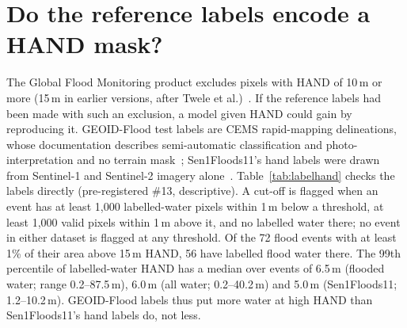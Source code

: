 \documentclass[journal,onecolumn]{IEEEtran}
\begin{document}
\section*{Do the reference labels encode a HAND mask?}

The Global Flood Monitoring product excludes pixels with HAND of 10\,m or more (15\,m in earlier versions,
after Twele et al.)~\cite{gfm2025pdd,twele2016sentinel1}. If the reference labels had been made with such an
exclusion, a model given HAND could gain by reproducing it. GEOID-Flood test labels are CEMS rapid-mapping
delineations, whose documentation describes semi-automatic classification and photo-interpretation and no
terrain mask~\cite{joubertboitat2020cemsrm}; Sen1Floods11's hand labels were drawn from Sentinel-1 and
Sentinel-2 imagery alone~\cite{bonafilia2020sen1floods11}. Table~\ref{tab:labelhand} checks the labels
directly (pre-registered \#13, descriptive). A cut-off is flagged when an event has at least 1,000
labelled-water pixels within 1\,m below a threshold, at least 1,000 valid pixels within 1\,m above it, and no
labelled water there; no event in either dataset is flagged at any threshold. Of the 72 flood events with at
least 1\% of their area above 15\,m HAND, 56 have labelled flood water there. The 99th percentile of
labelled-water HAND has a median over events of 6.5\,m (flooded water; range 0.2--87.5\,m), 6.0\,m (all
water; 0.2--40.2\,m) and 5.0\,m (Sen1Floods11; 1.2--10.2\,m). GEOID-Flood labels thus put more water at high
HAND than Sen1Floods11's hand labels do, not less.

\begin{table}[H]
\caption{Labelled water above HAND thresholds, per event. Events: events with at least 1\% of their valid
area above the threshold; none above: of these, events with no labelled water above it; median share: median
over all events of the share of labelled water above the threshold; cut-offs: see text.}
\label{tab:labelhand}
\centering
{}
\end{table}
\end{document}
